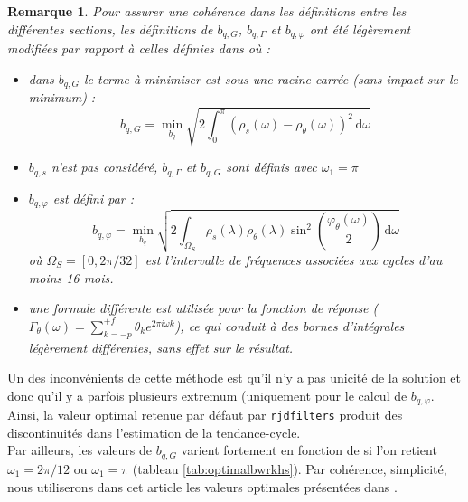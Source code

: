 \documentclass[
  12pt,
  a4paper,french]{article}
\newcommand\1{\mathds{1}}
\newcommand\ud{\,\mathrm{d}}
\newtheorem*{remarque}{Remarque}
\begin{document}
\begin{remarque}

Pour assurer une cohérence dans les définitions entre les différentes sections, les définitions de \(b_{q,G}\), \(b_{q,\Gamma}\) et \(b_{q,\varphi}\) ont été légèrement modifiées par rapport à celles définies dans \textcite{dagumbianconcini2015new} où :

\begin{itemize}
\item
  dans \(b_{q,G}\) le terme à minimiser est sous une racine carrée (sans impact sur le minimum) :
  \[
  b_{q,G}=\underset{b_q}{\min}\sqrt{
  2\int_{0}^{\pi}
  \left(\rho_s(\omega)-\rho_\theta(\omega)\right)^{2}\ud \omega}
  \]
\item
  \(b_{q,s}\) n'est pas considéré, \(b_{q,\Gamma}\) et \(b_{q,G}\) sont définis avec \(\omega_1=\pi\)
\item
  \(b_{q,\varphi}\) est défini par :
  \[
  b_{q,\varphi}=\underset{b_q}{\min}
  \sqrt{2\int_{\Omega_S}
  \rho_s(\lambda)\rho_\theta(\lambda)\sin^{2}\left(\frac{\varphi_\theta(\omega)}{2}\right)\ud \omega}
  \]
  où \(\Omega_S=[0,2\pi/32]\) est l'intervalle de fréquences associées aux cycles d'au moins 16 mois.
\item
  une formule différente est utilisée pour la fonction de réponse (\(\Gamma_\theta(\omega)=\sum_{k=-p}^{+f} \theta_k e^{2\pi i \omega k}\)), ce qui conduit à des bornes d'intégrales légèrement différentes, sans effet sur le résultat.
\end{itemize}

\end{remarque}

Un des inconvénients de cette méthode est qu'il n'y a pas unicité de la solution et donc qu'il y a parfois plusieurs extremum (uniquement pour le calcul de \(b_{q,\varphi}\).
Ainsi, la valeur optimal retenue par défaut par \texttt{rjdfilters} produit des discontinuités dans l'estimation de la tendance-cycle.\\
Par ailleurs, les valeurs de \(b_{q,G}\) varient fortement en fonction de si l'on retient \(\omega_1=2\pi/12\) ou \(\omega_1=\pi\) (tableau \ref{tab:optimalbwrkhs}).
Par cohérence, simplicité, nous utiliserons dans cet article les valeurs optimales présentées dans \textcite{dagumbianconcini2015new}.
\end{document}
